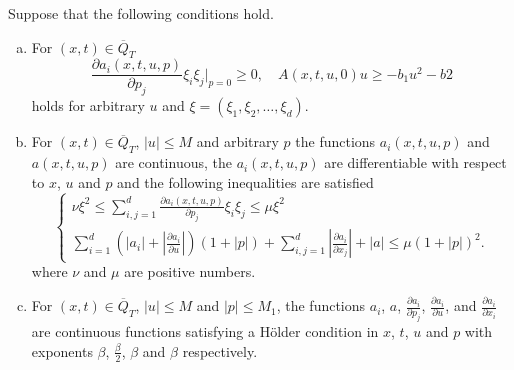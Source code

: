 \documentclass[11pt, a4paper]{article}
\begin{document}
\begin{theorem}
\label{thm:classical_existence}
Suppose that the following conditions hold.
\begin{enumerate}[a)]
	\item For $(x,t) \in \overline{Q}_T$ 
	\begin{equation}
		\label{exist_cond1}
		\frac{\partial a_i(x,t,u,p)}{\partial p_j}\xi_i \xi_j \Bigg|_{p=0} \geq 0, \quad A(x,t,u,0)u \geq -b_1 u^2 - b2
	\end{equation}
	 holds for arbitrary $u$ and $\xi = (\xi_1, \xi_2, \ldots, \xi_d)$.
	
	\item For $(x,t) \in \overline{Q}_T$, $|u| \leq M$ and arbitrary $p$ the functions $a_i(x,t,u,p)$ and $a(x,t,u,p)$ are continuous, the $a_i(x,t,u,p)$ are differentiable with respect to $x$, $u$ and $p$ and the following inequalities are satisfied
	\begin{equation}
	\label{exist_cond3}
		\begin{cases}
			\nu\xi^2 \leq \sum_{i,j=1}^d\frac{\partial a_i(x,t,u,p)}{\partial p_j}\xi_i \xi_j \leq \mu \xi^2 \\
			\sum_{i=1}^d \left(|a_i| + |\frac{\partial a_i}{\partial u}|\right)(1+|p|) + \sum_{i,j=1}^d |\frac{\partial a_i}{\partial x_j}| + |a| \leq \mu (1 + |p|)^2. 		
		\end{cases}
	\end{equation}
	where $\nu$ and $\mu$ are positive numbers.
	
	\item For $(x,t) \in \overline{Q}_T$, $|u| \leq M$ and $|p| \leq M_1$, the functions $a_i$, $a$, $\frac{\partial a_i}{\partial p_j}$, $\frac{\partial a_i}{\partial u}$, and $\frac{\partial a_i}{\partial x_i}$ are continuous functions satisfying a Hölder condition in $x$, $t$, $u$ and $p$ with exponents $\beta$, $\frac{\beta}{2}$, $\beta$ and $\beta$ respectively.
	

\end{enumerate}
\end{theorem}
\end{document}
